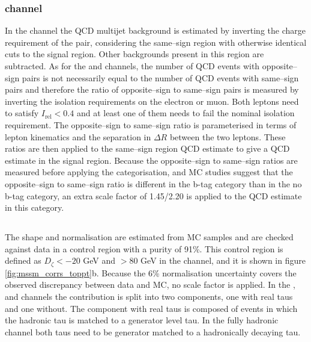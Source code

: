 \subsubsection{\texorpdfstring{\emu channel}{e mu channel}}
\label{sec:mssm_bkgs_qcd_em}
In the \emu channel the QCD multijet background
is estimated by inverting the charge requirement
of the pair, considering the same--sign region
with otherwise identical cuts to the signal region.
Other backgrounds present in this region are subtracted.
As for the \etau and \mutau channels, the number of
QCD events with opposite--sign \emu pairs is not
necessarily equal to the number of QCD events
with same--sign \emu pairs and therefore the ratio
of opposite--sign to same--sign pairs is measured by inverting
the isolation requirements on the electron or muon. Both
leptons need to satisfy $I_{\text{rel}} < 0.4$ and at 
least one of them needs to fail the nominal isolation requirement.
The opposite--sign to same--sign ratio is parameterised in terms
of lepton kinematics and the separation in $\Delta R$ between the
two leptons. These ratios are then applied to the same--sign region
QCD estimate to give a QCD estimate in the signal region. 
Because the opposite--sign to same--sign ratios are measured
before applying the categorisation, and \ac{MC} studies suggest
that the opposite--sign to same--sign ratio is different in the b-tag
category than in the no b-tag category, an extra scale factor of 
1.45/2.20 is applied to the QCD estimate in this category.


\subsection{\texorpdfstring{\ttbar}{ttbar}}
\label{sec:mssm_bkgs_tt}
The \ttbar shape and normalisation are estimated from \ac{MC} 
samples and are checked against data in a control
region with a \ttbar purity of 91\%. This control region
is defined as $D_{\zeta} < -20$ GeV and \MET $>80$ GeV in 
the \emu channel, and it is shown in
figure \ref{fig:mssm_corrs_toppt}b. Because the 6\%
\ttbar normalisation uncertainty covers the observed
discrepancy between data and \ac{MC}, no scale factor is applied.
In the \mutau, \etau and \tautau channels
the \ttbar contribution is split into
two components, one with real taus and 
one without. The component with real taus is composed
of \ttbar events in which the hadronic tau is matched
to a generator level tau. In the fully hadronic channel
both taus need to be generator matched to a hadronically
decaying tau.

